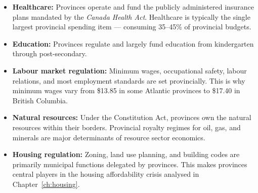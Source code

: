 \begin{itemize}
  \item \textbf{Healthcare:} Provinces operate and fund the publicly administered
        insurance plans mandated by the \textit{Canada Health Act}. Healthcare
        is typically the single largest provincial spending item --- consuming
        35--45\% of provincial budgets.
  \item \textbf{Education:} Provinces regulate and largely fund education from
        kindergarten through post-secondary.
  \item \textbf{Labour market regulation:} Minimum wages, occupational safety,
        labour relations, and most employment standards are set provincially.
        This is why minimum wages vary from \$13.85 in some Atlantic provinces
        to \$17.40 in British Columbia.
  \item \textbf{Natural resources:} Under the Constitution Act, provinces own
        the natural resources within their borders. Provincial royalty regimes
        for oil, gas, and minerals are major determinants of resource sector
        economics.
  \item \textbf{Housing regulation:} Zoning, land use planning, and building
        codes are primarily municipal functions delegated by provinces. This
        makes provinces central players in the housing affordability crisis
        analysed in Chapter~\ref{ch:housing}.
\end{itemize}

